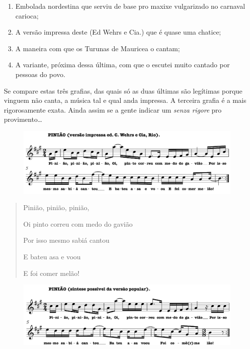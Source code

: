 \begin{enumerate}
\item  Embolada nordestina que serviu de base pro maxixe vulgarizado no carnaval carioca; 
\item  A versão impressa deste (Ed Wehrs e Cia.) que é quase uma chatice; 
\item  A maneira com que os Turunas de Mauricea o cantam;
\item  A variante, próxima dessa última, com que o escutei muito cantado por pessoas do povo. 
\end{enumerate}

Se compare estas três grafias, das quais só as duas
últimas são legítimas porque vinguem não canta, a música tal e qual anda
impressa. A terceira grafia é a mais rigorosamente exata. Ainda assim se
a gente indicar um \textit{senza rigore} pro provimento\ldots{}

 \begin{figure}[H]
 \includegraphics[width=\textwidth]{./imgs/fig1.pdf}
 \end{figure}

\begin{quote}
\forceindent{}Pinião, pinião, pinião,

Oi pinto correu com medo do gavião

Por isso mesmo sabiá cantou

E bateu asa e voou

E foi comer melão!
\end{quote}

 \begin{figure}[H]
 \includegraphics[width=\textwidth]{./imgs/fig2.pdf}
 \end{figure}

